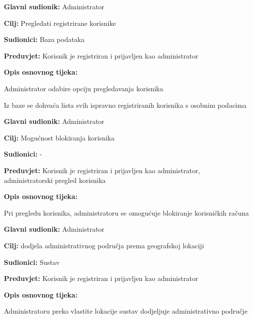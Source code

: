 \noindent {}
\begin{packed_item}
	
	\item \textbf{Glavni sudionik: }Administrator
	\item  \textbf{Cilj:} Pregledati registrirane korisnike
	\item  \textbf{Sudionici:} Baza podataka
	\item  \textbf{Preduvjet:} Korisnik je registriran i prijavljen kao administrator
	\item  \textbf{Opis osnovnog tijeka:}
	
	\item[] \begin{packed_enum}
		
		\item Administrator odabire opciju pregledavanja korisnika
		\item Iz baze se dohvaća lista svih ispravno registriranih korisnika s osobnim podacima
	\end{packed_enum}
\end{packed_item}

\noindent {}
\begin{packed_item}
	\item \textbf{Glavni sudionik: }Administrator
	\item  \textbf{Cilj:} Mogućnost blokiranja korisnika
	\item  \textbf{Sudionici:} -
	\item  \textbf{Preduvjet:} Korisnik je registriran i prijavljen kao administrator, administratorski pregled korisnika
	\item  \textbf{Opis osnovnog tijeka:}
	
	\item[] \begin{packed_enum}
		
		\item Pri pregledu korisnika, administratoru se omogućuje blokiranje korisničkih računa
	\end{packed_enum}
\end{packed_item}
\newpage
\noindent {}
\begin{packed_item}
	\item \textbf{Glavni sudionik: }Administrator
	\item  \textbf{Cilj:} dodjela administrativnog područja prema geografskoj lokaciji
	\item  \textbf{Sudionici:} Sustav
	\item  \textbf{Preduvjet:} Korisnik je registriran i prijavljen kao administrator
	\item  \textbf{Opis osnovnog tijeka:}
	\item[] \begin{packed_enum}
		\item Administratoru preko vlastite lokacije sustav dodjeljuje administrativno područje
	\end{packed_enum}
\end{packed_item}

